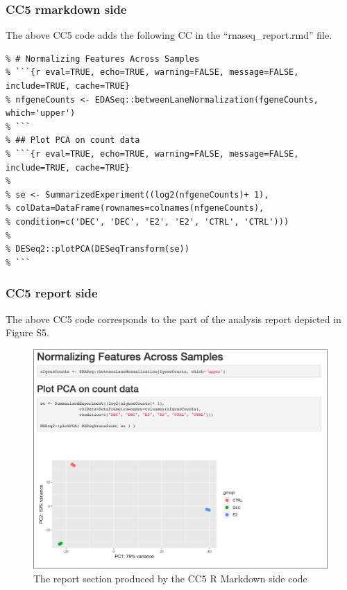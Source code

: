 \documentclass[]{article}
\begin{document}
\hypertarget{cc5-rmarkdown-side}{%
\subsubsection{CC5 rmarkdown side}\label{cc5-rmarkdown-side}}

The above CC5 code adds the following CC in the ``rnaseq\_report.rmd''
file.

\begin{verbatim}
% # Normalizing Features Across Samples
% ```{r eval=TRUE, echo=TRUE, warning=FALSE, message=FALSE, include=TRUE, cache=TRUE}
% nfgeneCounts <- EDASeq::betweenLaneNormalization(fgeneCounts, which='upper')
% ```
% ## Plot PCA on count data
% ```{r eval=TRUE, echo=TRUE, warning=FALSE, message=FALSE, include=TRUE, cache=TRUE}
% 
% se <- SummarizedExperiment((log2(nfgeneCounts)+ 1),
% colData=DataFrame(rownames=colnames(nfgeneCounts), 
% condition=c('DEC', 'DEC', 'E2', 'E2', 'CTRL', 'CTRL')))
% 
% DESeq2::plotPCA(DESeqTransform(se))
% ```
\end{verbatim}

\newpage

\hypertarget{cc5-report-side}{%
\subsubsection{CC5 report side}\label{cc5-report-side}}

The above CC5 code corresponds to the part of the analysis report
depicted in Figure S5.

\begin{figure}[ht]

{\centering \includegraphics[width=0.9\linewidth]{imgs/5} 

}

\caption{The report section produced by the CC5 R Markdown side code}\label{fig:unnamed-chunk-12}
\end{figure}
\end{document}
